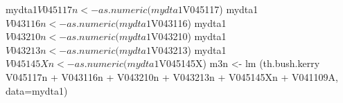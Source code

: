 \begin{Schunk}
\begin{Sinput}
 mydta1$V045117n <- as.numeric(mydta1$V045117)
 mydta1$V043116n <- as.numeric(mydta1$V043116)
 mydta1$V043210n <- as.numeric(mydta1$V043210)
 mydta1$V043213n <- as.numeric(mydta1$V043213)
 mydta1$V045145Xn <- as.numeric(mydta1$V045145X)
 m3n <- lm (th.bush.kerry ~ V045117n + V043116n + V043210n + V043213n + V045145Xn + V041109A, data=mydta1) 
\end{Sinput}
\end{Schunk}

